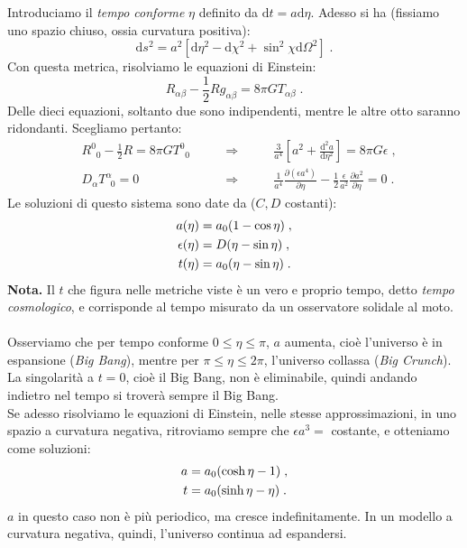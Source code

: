 \documentclass[12pt,a4paper]{report}
\theoremstyle{definition}
\newcommand{\dev}[3][]{\frac{\mathrm{d}^{#1} #2}{\mathrm{d} #3^{#1}}}
\newcommand{\diff}[1][]{\mathrm{d}#1}
\begin{document}
Introduciamo il \emph{tempo conforme} $\eta$ definito da $\diff{t}=a\diff{\eta}$. Adesso si ha (fissiamo uno spazio chiuso, ossia curvatura positiva):
\begin{equation}
\diff{s}^2=a^2[\diff{\eta}^2-\diff{\chi}^2+\sin^2\chi\diff{\Omega}^2]\;.
\end{equation}
Con questa metrica, risolviamo le equazioni di Einstein:
$$
R_{\alpha\beta}-\frac{1}{2}Rg_{\alpha\beta}=8\pi GT_{\alpha\beta}\;.
$$
Delle dieci equazioni, soltanto due sono indipendenti, mentre le altre otto saranno ridondanti. Scegliamo pertanto:
\begin{align}
& R^0_{\;\;0}-\frac{1}{2}R=8\pi GT^0_{\;\;0}\qquad &\Longrightarrow\qquad &\frac{3}{a^4}\left[a^2+\dev[2]{a}{\eta}\right]=8\pi G\epsilon\;, \\
& D_{\alpha}T^{\alpha}_{\;\;0}=0\qquad &\Longrightarrow\qquad &\frac{1}{a^4}\frac{\partial(\epsilon a^4)}{\partial\eta}-\frac{1}{2}\frac{\epsilon}{a^2}\frac{\partial a^2}{\partial\eta}=0\;.
\end{align}
Le soluzioni di questo sistema sono date da ($C,D$ costanti):
\begin{align}
a(\eta) &= a_0(1-\cos\eta)\;, \notag \\
\epsilon(\eta) &= D(\eta-\sin\eta) \notag \;,\\
t(\eta) &= a_0(\eta-\sin\eta)\;.
\end{align}
\textbf{Nota.} Il $t$ che figura nelle metriche viste è un vero e proprio tempo, detto \emph{tempo cosmologico}, e corrisponde al tempo misurato da un osservatore solidale al moto. \\
\\
Osserviamo che per tempo conforme $0\le \eta\le \pi$, $a$ aumenta, cioè l'universo è in espansione (\emph{Big Bang}), mentre per $\pi\le\eta\le2\pi$, l'universo collassa (\emph{Big Crunch}). La singolarità a $t=0$, cioè il Big Bang, non è eliminabile, quindi andando indietro nel tempo si troverà sempre il Big Bang.\\
Se adesso risolviamo le equazioni di Einstein, nelle stesse approssimazioni, in uno spazio a curvatura negativa, ritroviamo sempre che $\epsilon a^3=$ costante, e otteniamo come soluzioni:
\begin{align}
a &= a_0(\cosh\eta -1) \notag\;, \\
t &= a_0(\sinh\eta -\eta)\;.
\end{align}
$a$ in questo caso non è più periodico, ma cresce indefinitamente. In un modello a curvatura negativa, quindi, l'universo continua ad espandersi. \\
\end{document}
